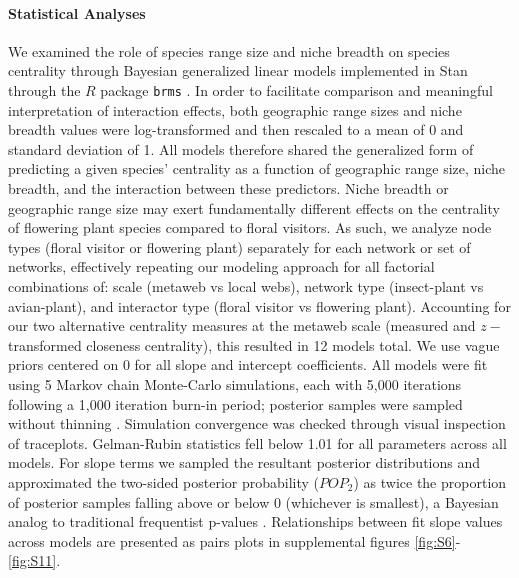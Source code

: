 \documentclass[12pt]{article}
\begin{document}
\paragraph*{Statistical Analyses}
We examined the role of species range size and niche breadth on species centrality through Bayesian generalized linear models implemented in Stan\citep{carpenter2017stan} through the $R$ package \texttt{brms} \citep{burkner2017brms}. In order to facilitate comparison and meaningful interpretation of interaction effects, both geographic range sizes and niche breadth values were log-transformed and then rescaled to a mean of 0 and standard deviation of 1. All models therefore shared the generalized form of predicting a given species' centrality as a function of geographic range size, niche breadth, and the interaction between these predictors. Niche breadth or geographic range size may exert fundamentally different effects on the centrality of flowering plant species compared to floral visitors. As such, we analyze node types (floral visitor or flowering plant) separately for each network or set of networks, effectively repeating our modeling approach for all factorial combinations of: scale (metaweb vs local webs), network type (insect-plant vs avian-plant), and interactor type (floral visitor vs flowering plant). Accounting for our two alternative centrality measures at the metaweb scale (measured and $z-$transformed closeness centrality), this resulted in 12 models total. We use vague priors centered on 0 for all slope and intercept coefficients. All models were fit using 5 Markov chain Monte-Carlo simulations, each with 5,000 iterations following a 1,000 iteration burn-in period; posterior samples were sampled without thinning \citep{link2012thinning}. Simulation convergence was checked through visual inspection of traceplots. Gelman-Rubin statistics fell below 1.01 for all parameters across all models.  For slope terms we sampled the resultant posterior distributions and approximated the two-sided posterior probability ($POP_2$) as twice the proportion of posterior samples falling above or below 0 (whichever is smallest), a Bayesian analog to traditional frequentist p-values \citep{shi2021reconnecting}. Relationships between fit slope values across models are presented as pairs plots in supplemental figures \ref{fig:S6}-\ref{fig:S11}. 
\end{document}
